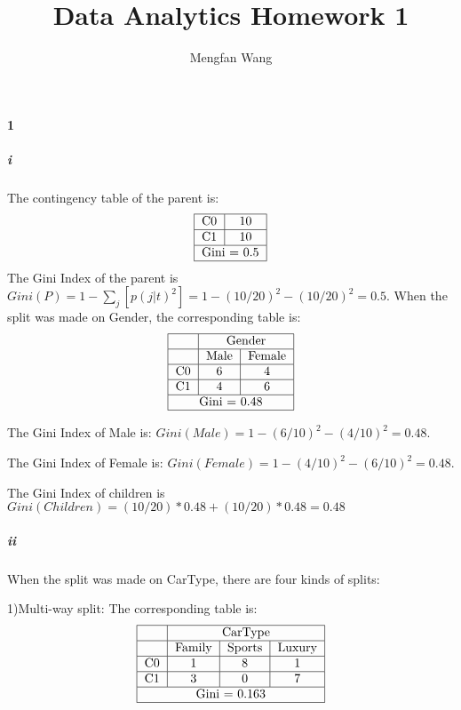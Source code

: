 \documentclass[22pt]{article}
\author{Mengfan Wang}
\title{Data Analytics Homework 1}
\begin{document}
	\maketitle 
	\paragraph{1}
		\subparagraph{i} The contingency table of the parent is:
		\begin{equation}
		\begin{tabular}{|c|c|}
			\hline
			 C0&10\\ 
			 \hline
			 C1&10\\  
			 \hline 
			 \multicolumn{2}{|c|}{Gini = 0.5}\\
			 \hline
		\end{tabular}
		\end{equation}
		The Gini Index of the parent is $Gini(P) = 1 - \sum_j[p(j|t)^2] = 1- (10/20)^2 - (10/20)^2 = 0.5$. When the split was made on Gender, the corresponding table is:
		\begin{equation}
		\begin{tabular}{|c|c|c|}
			\hline
			&\multicolumn{2}{c|}{Gender}\\
			\hline
			& Male & Female\\ \hline
			 C0&6&4\\ 
			 \hline
			 C1&4&6\\  
			 \hline 
			 \multicolumn{3}{|c|}{Gini = 0.48}\\
			 \hline
		\end{tabular}
		\end{equation}

		The Gini Index of Male is: $Gini(Male) = 1 - (6/10)^2-(4/10)^2 = 0.48$. 

		The Gini Index of Female is: $Gini(Female) = 1 - (4/10)^2-(6/10)^2 = 0.48$.

		The Gini Index of children is $Gini(Children) = (10/20)*0.48 + (10/20) *0.48 = 0.48$

		\subparagraph{ii} When the split was made on CarType, there are four kinds of splits:

		1)Multi-way split: The corresponding table is:
		\begin{equation}
		\begin{tabular}{|c|c|c|c|}
			\hline
			&\multicolumn{3}{c|}{CarType}\\
			\hline
			& Family & Sports & Luxury\\ \hline
			 C0&1&8&1\\ 
			 \hline
			 C1&3&0&7\\  
			 \hline 
			 \multicolumn{4}{|c|}{Gini = 0.163}\\
			 \hline
		\end{tabular}
		\end{equation}
\end{document}
